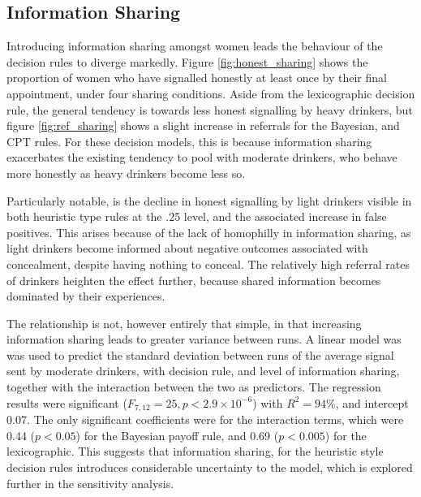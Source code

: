 \subsection{Information Sharing}
\label{sub:sharing_results}

Introducing information sharing amongst women leads the behaviour of the decision rules to diverge markedly. Figure \ref{fig:honest_sharing} shows the proportion of women who have signalled honestly at least once by their final appointment, under four sharing conditions. Aside from the lexicographic decision rule, the general tendency is towards less honest signalling by heavy drinkers, but figure \ref{fig:ref_sharing} shows a slight increase in referrals for the Bayesian, and \ac{CPT} rules. For these decision models, this is because information sharing exacerbates the existing tendency to pool with moderate drinkers, who behave more honestly as heavy drinkers become less so.

Particularly notable, is the decline in honest signalling by light drinkers visible in both heuristic type rules at the .25 level, and the associated increase in false positives. This arises because of the lack of homophilly in information sharing, as light drinkers become informed about negative outcomes associated with concealment, despite having nothing to conceal. The relatively high referral rates of drinkers heighten the effect further, because shared information becomes dominated by their experiences. 

The relationship is not, however entirely that simple, in that increasing information sharing leads to greater variance between runs. A linear model was was used to predict the standard deviation between runs of the average signal sent by moderate drinkers, with decision rule, and level of information sharing, together with the interaction between the two as predictors. The regression results were significant (\(F_{7,12}=25,p<2.9\times10^{-6}\)) with \(R^2=94\%\), and intercept 0.07. The only significant coefficients were for the interaction terms, which were 0.44 (\(p<0.05\)) for the Bayesian payoff rule, and 0.69 (\(p<0.005\)) for the lexicographic. This suggests that information sharing, for the heuristic style decision rules introduces considerable uncertainty to the model, which is explored further in the sensitivity analysis.

